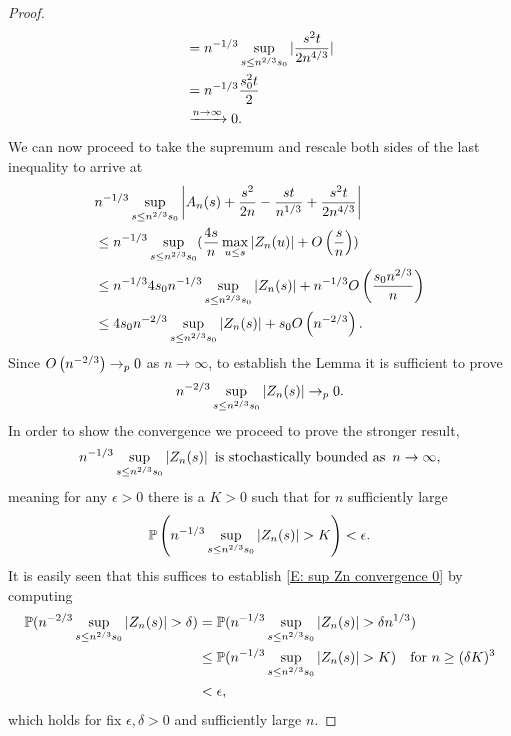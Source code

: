 \begin{proof}
\begin{align*}
    &= n^{-1 / 3} \sup_{s \leq n^{2 / 3} s_0 } |\frac{s^2t}{2n^{4 / 3}}| \\
    &= n^{-1 / 3} \frac{s_0^2t}{2} \\
    &\xrightarrow{n \rightarrow \infty} 0.
    \end{align*}
    We can now proceed to take the supremum and rescale both sides of the last inequality to arrive at
    \begin{equation}
    \begin{aligned}
    &n^{-1 / 3} \sup_{s \leq n^{2 / 3} s_0 } \left| A_n(s) + \frac{s^2}{2n} - \frac{st}{n^{1 / 3}}  + \frac{s^2t}{2n^{4 / 3}}  \right| \\
    &\leq n^{-1 / 3} \sup_{s \leq n^{2 / 3} s_0 } (\frac{4s}{n} \max_{u \leq s} |Z_n(u)| + O\left(\frac{s}{n}\right)) \\
    &\leq n^{-1 / 3} 4 s_0 n^{-1 / 3} \sup_{s \leq n^{2 / 3} s_0 } |Z_n(s)| + n^{-1 / 3}O\left(\frac{s_0 n^{2 / 3}}{n}\right) \\
    &\leq 4 s_0 n^{-2 / 3} \sup_{s \leq n^{2 / 3} s_0 } |Z_n(s)| + s_0 O\left(n^{-2 / 3}\right).
    \end{aligned}
    \end{equation}
    Since $O\left(n^{-2 / 3}\right) \rightarrow_p 0$ as $n \rightarrow \infty$, to establish the Lemma it is sufficient to prove
    \begin{equation} \label{E: sup Zn convergence 0}
    n^{-2 / 3} \sup_{s \leq n^{2 / 3} s_0 } |Z_n(s)| \rightarrow_p 0.
    \end{equation}
    In order to show the convergence we proceed to prove the stronger result,
    \begin{equation}
    n^{-1/3} \sup_{s \leq n^{2 / 3} s_0 } |Z_n(s)| 
    \enspace \text{is stochastically bounded as} \enspace n \rightarrow \infty ,
    \end{equation} 
    meaning for any  $ \epsilon > 0 $  there is a $ K > 0 $
    such that for $n$ sufficiently large 
    \begin{equation} \label{E: stoch bounded}
    \mathbb{P}\left( n^{-1/3} \sup_{s \leq n^{2 / 3} s_0 } |Z_n(s)| > K \right) < \epsilon. 
    \end{equation}
    It is easily seen that this suffices to establish \eqref{E: sup Zn convergence 0} by computing
    \begin{equation*}
    \begin{aligned}
    \mathbb{P}( n^{-2 / 3} \sup_{s \leq n^{2 / 3} s_0 } |Z_n(s)| > \delta)
	&= \mathbb{P}( n^{-1 / 3} \sup_{s \leq n^{2 / 3} s_0 } |Z_n(s)| > \delta n^{1 / 3} ) \\
	&\leq \mathbb{P}( n^{-1 / 3} \sup_{s \leq n^{2 / 3} s_0 } |Z_n(s)| > K) \quad \text{for $n \geq (\delta K)^3$} \\
	&< \epsilon,
    \end{aligned}
    \end{equation*}
    which holds for fix $\epsilon, \delta > 0$ and sufficiently large $n$.
    

\end{proof}
